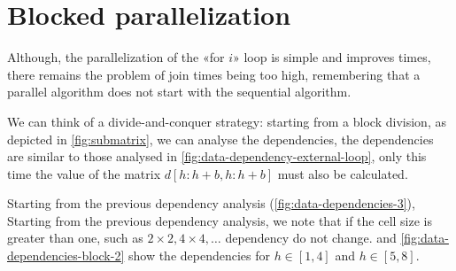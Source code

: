 \section{Blocked parallelization}\label{blocked_parallelization}

Although, the parallelization of the «for \(i\)» loop is simple and improves times, there remains the problem of join times being too high, remembering that a parallel algorithm does not start with the sequential algorithm.

We can think of a divide-and-conquer strategy: starting from a block division, as depicted in \cref{fig:submatrix}, we can analyse the dependencies, the dependencies are similar to those analysed in \cref{fig:data-dependency-external-loop}, only this time the value of the matrix \(d[h:h+b,h:h+b]\) must also be calculated.

Starting from the previous dependency analysis (\cref{fig:data-dependencies-3}), Starting from the previous dependency analysis, we note that if the cell size is greater than one, such as  \(  2 \times 2,  4 \times 4, \dots\) dependency do not change.
 and \ref{fig:data-dependencies-block-2} show the dependencies for \(h \in [1,4]\) and \(h \in [5,8]\).

